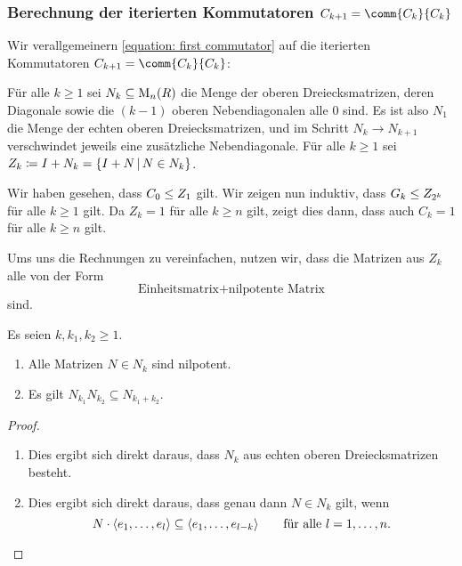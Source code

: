 \subsubsection*{Berechnung der iterierten Kommutatoren $C_{k+1} = \comm{C_k}{C_k}$}

Wir verallgemeinern \eqref{equation: first commutator} auf die iterierten Kommutatoren $C_{k+1} = \comm{C_k}{C_k}$:

Für alle $k \geq 1$ sei $N_k \subseteq \operatorname{M}_{n}(R)$ die Menge der oberen Dreiecksmatrizen, deren Diagonale sowie die $(k-1)$ oberen Nebendiagonalen alle $0$ sind.
Es ist also $N_1$ die Menge der echten oberen Dreiecksmatrizen, und im Schritt $N_k \to N_{k+1}$ verschwindet jeweils eine zusätzliche Nebendiagonale.
Für alle $k \geq 1$ sei $Z_k \coloneqq I + N_k = \{I + N \suchthat N \in N_k\}$.

Wir haben gesehen, dass $C_0 \leq Z_1$ gilt.
Wir zeigen nun induktiv, dass $G_k \leq Z_{2^k}$ für alle $k \geq 1$ gilt.
Da $Z_k = 1$ für alle $k \geq n$ gilt, zeigt dies dann, dass auch $C_k = 1$ für alle $k \geq n$ gilt.

Ums uns die Rechnungen zu vereinfachen, nutzen wir, dass die Matrizen aus $Z_k$ alle von der Form
\[
  \text{Einheitsmatrix} + \text{nilpotente Matrix}
\]
sind.

\begin{lemma}
  Es seien $k, k_1, k_2 \geq 1$.
  \begin{enumerate}
    \item
      Alle Matrizen $N \in N_k$ sind nilpotent.
    \item
      Es gilt $N_{k_1} N_{k_2} \subseteq N_{k_1 + k_2}$.
  \end{enumerate}
\end{lemma}
 
\begin{proof}
  \leavevmode
  \begin{enumerate}
    \item
      Dies ergibt sich direkt daraus, dass $N_k$ aus echten oberen Dreiecksmatrizen besteht.
    \item
      Dies ergibt sich direkt daraus, dass genau dann $N \in N_k$ gilt, wenn
      \[
                  N \cdot \langle e_1, \dotsc, e_l\rangle
        \subseteq \langle e_1, \dotsc, e_{l-k}\rangle
        \qquad    \text{für alle $l = 1, \dotsc, n$}.
        \qedhere
      \]
  \end{enumerate}
\end{proof}

